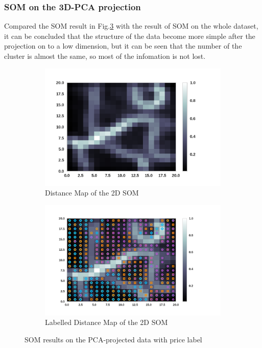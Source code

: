 \documentclass[12pt]{article}
\begin{document}
\subsubsection{SOM on the 3D-PCA projection}
Compared the SOM result in Fig.\ref{fig:som-pca-price1} with the result of SOM on the whole dataset, it can be concluded that the structure of the data become more simple after the projection on to a low dimension, but it can be seen that the number of the cluster is almost the same, so most of the infomation is not lost.
\begin{figure}
    \centering
    \begin{subfigure}[b]{0.47\textwidth}
        \includegraphics[width=\textwidth]{images/som-pca-price.png}
        \caption{Distance Map of the 2D SOM}
        \label{fig:som-pca-price}
    \end{subfigure}
    \begin{subfigure}[b]{0.47\textwidth}
        \includegraphics[width=\textwidth]{images/som-pca-price-label.png}
        \caption{Labelled Distance Map of the 2D SOM}
        \label{fig:som-pca-price}
    \end{subfigure}
    \caption{SOM results on the PCA-projected data with price label}\label{fig:som-pca-price1}
\end{figure} 
\end{document}
